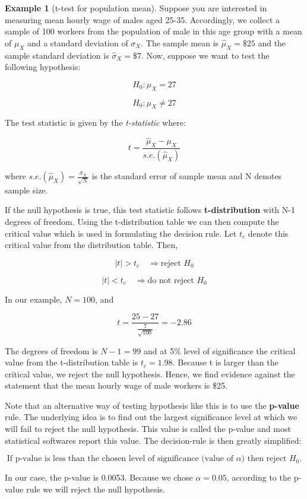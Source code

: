 \documentclass[
]{book}
\theoremstyle{definition}
\theoremstyle{definition}
\newtheorem{example}{Example}[chapter]
\theoremstyle{definition}
\theoremstyle{definition}
\theoremstyle{remark}
\begin{document}
\begin{example}[t-test for population mean]
\protect\hypertarget{exm:unnamed-chunk-48}{}\label{exm:unnamed-chunk-48}Suppose you are interested in measuring mean hourly wage of males aged 25-35. Accordingly, we collect a sample of 100 workers from the population of male in this age group with a mean of \(\mu_X\) and a standard deviation of \(\sigma_X\). The sample mean is \(\hat{\mu}_X=\$25\) and the sample standard deviation is \(\hat{\sigma}_X=\$7\). Now, suppose we want to test the following hypothesis:

\[H_0: \mu_X=27\]

\[H_0: \mu_X \neq 27\]

The test statistic is given by the \emph{t-statistic} where:

\[t=\frac{\hat{\mu}_X-\mu_X}{s.e.(\hat{\mu}_X)} \]

where \(s.e.(\hat{\mu}_X)=\displaystyle \frac{\hat{\sigma}_X}{\sqrt{N}}\) is the standard error of sample mean and N denotes sample size.

If the null hypothesis is true, this test statistic follows \textbf{t-distribution} with N-1 degrees of freedom. Using the t-distribution table we can then compute the critical value which is used in formulating the decision rule. Let \(t_c\) denote this critical value from the distribution table. Then,

\[|t|>t_c \quad \Rightarrow  \text{reject $H_0$} \]

\[|t|<t_c \quad \Rightarrow  \text{do not reject $H_0$} \]

In our example, \(N=100\), and

\[t=\frac{25-27}{\frac{7}{\sqrt{100}}}=-2.86\]

The degrees of freedom is \(N-1=99\) and at 5\% level of significance the critical value from the t-distribution table is \(t_c=1.98\). Because \textbar t\textbar{} is larger than the critical value, we reject the null hypothesis. Hence, we find evidence against the statement that the mean hourly wage of male workers is \$25.

Note that an alternative way of testing hypothesis like this is to use the \textbf{p-value} rule. The underlying idea is to find out the largest significance level at which we will fail to reject the null hypothesis. This value is called the p-value and most statistical softwares report this value. The decision-rule is then greatly simplified:

\[\text{If p-value is less than the chosen level of significance (value of $\alpha$) then reject $H_0$.}\]

In our case, the p-value is 0.0053. Because we chose \(\alpha=0.05\), according to the p-value rule we will reject the null hypothesis.
\end{example}
\end{document}
